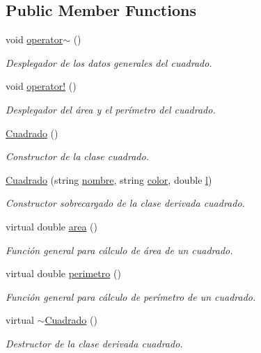 \subsection*{Public Member Functions}
\begin{DoxyCompactItemize}
\item 
void \hyperlink{class_cuadrado_a6303f81de8d357f415d00a116b73a6fc}{operator$\sim$} ()
\begin{DoxyCompactList}\small\item\em Desplegador de los datos generales del cuadrado. \end{DoxyCompactList}\item 
void \hyperlink{class_cuadrado_a78be5dcef640ad7f82858f44fb623af5}{operator!} ()
\begin{DoxyCompactList}\small\item\em Desplegador del área y el perímetro del cuadrado. \end{DoxyCompactList}\item 
\hyperlink{class_cuadrado_ad28d9dddc29e1987ec620b07b0a4acc9}{Cuadrado} ()
\begin{DoxyCompactList}\small\item\em Constructor de la clase cuadrado. \end{DoxyCompactList}\item 
\hyperlink{class_cuadrado_aaeebb8a15944b47e9df84d7a317f3ce7}{Cuadrado} (string \hyperlink{class_cuadrado_a2d85cc9025c27709524fff4f8ee89645}{nombre}, string \hyperlink{class_cuadrado_ae8ad3499e4f99746dde86b42b3e50c2d}{color}, double \hyperlink{class_cuadrado_ab4d463c9fd9ef33f69a6fdb33cca2a41}{l})
\begin{DoxyCompactList}\small\item\em Constructor sobrecargado de la clase derivada cuadrado. \end{DoxyCompactList}\item 
virtual double \hyperlink{class_cuadrado_a379a755de0b95f295e30e6049e19426c}{area} ()
\begin{DoxyCompactList}\small\item\em Función general para cálculo de área de un cuadrado. \end{DoxyCompactList}\item 
virtual double \hyperlink{class_cuadrado_aa7072852e41bde681376b57503495c74}{perimetro} ()
\begin{DoxyCompactList}\small\item\em Función general para cálculo de perímetro de un cuadrado. \end{DoxyCompactList}\item 
virtual \hyperlink{class_cuadrado_a9f5bf29c9b8368ad45a4a3c12f9fd7c2}{$\sim$\+Cuadrado} ()
\begin{DoxyCompactList}\small\item\em Destructor de la clase derivada cuadrado. \end{DoxyCompactList}\end{DoxyCompactItemize}
